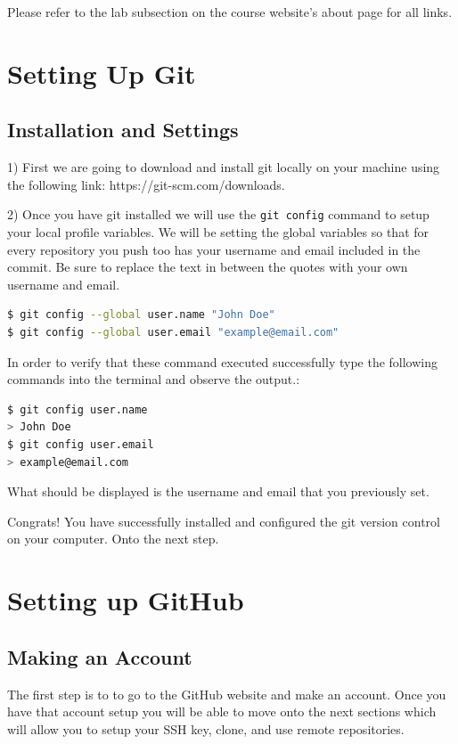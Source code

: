 \documentclass[a4paper,10pt]{article} %
\begin{document}
Please refer to the lab subsection on the course website's about page for all
links.

\section{Setting Up Git}

\subsection{Installation and Settings}

1) First we are going to download and install git locally on your machine using the following link: https://git-scm.com/downloads.

2) Once you have git installed we will use the \lstinline|git config| command to setup your local profile variables. We will be setting the global variables so that for every repository you push too has your username and email included in the commit. Be sure to replace the text in between the quotes with your own username and email.

\begin{lstlisting}[language=bash]
$ git config --global user.name "John Doe"
$ git config --global user.email "example@email.com"
\end{lstlisting}

In order to verify that these command executed successfully type the following commands into the terminal and observe the output.:
\begin{lstlisting}[language=bash]
$ git config user.name
> John Doe
$ git config user.email
> example@email.com
\end{lstlisting}
What should be displayed is the username and email that you previously set.

Congrats! You have successfully installed and configured the git version control on your computer. Onto the next step.

\section{Setting up GitHub}

\subsection{Making an Account}

The first step is to to go to the GitHub website and make an account. 
Once you have that account setup you will be able to move onto 
the next sections which will allow you to setup your SSH key, clone,
and use remote repositories.
\end{document}
